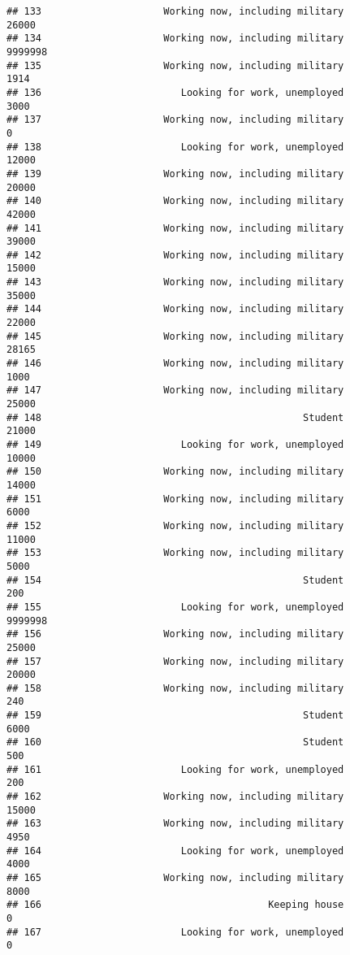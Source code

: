 \documentclass[]{book}
\theoremstyle{definition}
\theoremstyle{definition}
\theoremstyle{remark}
\begin{document}
\begin{verbatim}
## 133                     Working now, including military           26000
## 134                     Working now, including military         9999998
## 135                     Working now, including military            1914
## 136                        Looking for work, unemployed            3000
## 137                     Working now, including military               0
## 138                        Looking for work, unemployed           12000
## 139                     Working now, including military           20000
## 140                     Working now, including military           42000
## 141                     Working now, including military           39000
## 142                     Working now, including military           15000
## 143                     Working now, including military           35000
## 144                     Working now, including military           22000
## 145                     Working now, including military           28165
## 146                     Working now, including military            1000
## 147                     Working now, including military           25000
## 148                                             Student           21000
## 149                        Looking for work, unemployed           10000
## 150                     Working now, including military           14000
## 151                     Working now, including military            6000
## 152                     Working now, including military           11000
## 153                     Working now, including military            5000
## 154                                             Student             200
## 155                        Looking for work, unemployed         9999998
## 156                     Working now, including military           25000
## 157                     Working now, including military           20000
## 158                     Working now, including military             240
## 159                                             Student            6000
## 160                                             Student             500
## 161                        Looking for work, unemployed             200
## 162                     Working now, including military           15000
## 163                     Working now, including military            4950
## 164                        Looking for work, unemployed            4000
## 165                     Working now, including military            8000
## 166                                       Keeping house               0
## 167                        Looking for work, unemployed               0

\end{verbatim}
\end{document}
